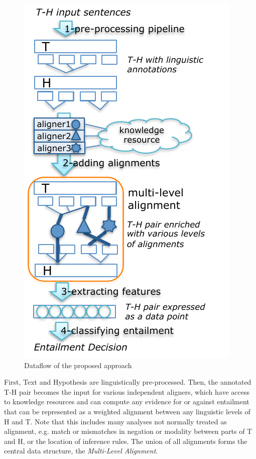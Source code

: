\documentclass[11pt,letterpaper]{article}
\begin{document}
\begin{figure}[t!b]
  \centering
  \includegraphics[width=0.9\columnwidth]{figures/figure1.pdf}
  \caption{Dataflow of the proposed approach}
  \label{fig:1}
\end{figure}

First, Text and Hypothesis are linguistically pre-processed. Then, the
annotated T-H pair becomes the input for various independent aligners,
which have access to knowledge resources and can compute any evidence
for or against entailment that can be represented as a weighted
alignment between any linguistic levels of H and T. Note that this
includes many analyses not normally treated as alignment, e.g. match
or mismatches in negation or modality between parts of T and H, or the
location of inference rules. The union of all alignments forms the
central data structure, the {\em Multi-Level Alignment}.
\end{document}
